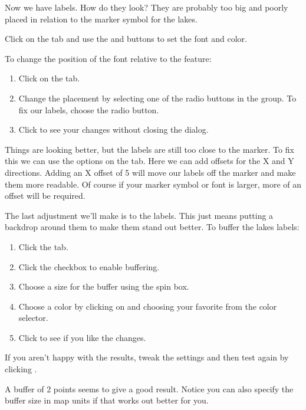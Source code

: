 Now we have labels. How do they look? They are probably too big and poorly
placed in relation to the marker symbol for the lakes.

Click on the  tab and use the  and 
buttons to set the font and color.

To change the position of the font relative to the feature:

\begin{enumerate} 
\item Click on the  tab.
\item Change the placement by selecting one of the radio buttons
in the  group. To fix our labels, choose the
 radio button.
\item Click  to see your changes without closing the dialog.
\end{enumerate} 

Things are looking better, but the labels are still too close to the marker. To
fix this we can use the options on the  tab. Here we can add
offsets for the X and Y directions. Adding an X offset of 5 will move our
labels off the marker and make them more readable. Of course if your marker
symbol or font is larger, more of an offset will be required.

The last adjustment we'll make is to  the labels. This just means
putting a backdrop around them to make them stand out better. To buffer the
lakes labels:

\begin{enumerate}
\item Click the  tab.
\item Click the  checkbox to enable buffering.
\item Choose a size for the buffer using the spin box.
\item Choose a color by clicking on  and choosing your
  favorite from the color selector.
\item Click  to see if you like the changes.
\end{enumerate} 

If you aren't happy with the results, tweak the settings and then test again
by clicking .

A buffer of 2 points seems to give a good result.
Notice you can also specify the buffer size in map units if that works out
better for you.

